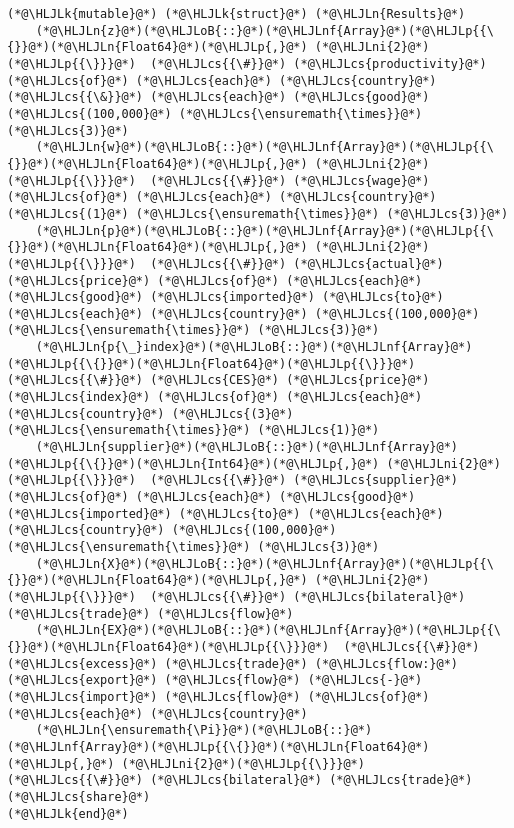 \documentclass[12pt,a4paper]{article}
\newcommand{\HLJLk}[1]{\textcolor[RGB]{148,91,176}{\textbf{#1}}}
\newcommand{\HLJLn}[1]{#1}
\newcommand{\HLJLnf}[1]{\textcolor[RGB]{66,102,213}{#1}}
\newcommand{\HLJLni}[1]{\textcolor[RGB]{59,151,46}{#1}}
\newcommand{\HLJLoB}[1]{\textcolor[RGB]{102,102,102}{\textbf{#1}}}
\newcommand{\HLJLp}[1]{#1}
\newcommand{\HLJLcs}[1]{\textcolor[RGB]{153,153,119}{\textit{#1}}}
\begin{document}
\begin{lstlisting}
(*@\HLJLk{mutable}@*) (*@\HLJLk{struct}@*) (*@\HLJLn{Results}@*)
    (*@\HLJLn{z}@*)(*@\HLJLoB{::}@*)(*@\HLJLnf{Array}@*)(*@\HLJLp{{\{}}@*)(*@\HLJLn{Float64}@*)(*@\HLJLp{,}@*) (*@\HLJLni{2}@*)(*@\HLJLp{{\}}}@*)  (*@\HLJLcs{{\#}}@*) (*@\HLJLcs{productivity}@*) (*@\HLJLcs{of}@*) (*@\HLJLcs{each}@*) (*@\HLJLcs{country}@*) (*@\HLJLcs{{\&}}@*) (*@\HLJLcs{each}@*) (*@\HLJLcs{good}@*) (*@\HLJLcs{(100,000}@*) (*@\HLJLcs{\ensuremath{\times}}@*) (*@\HLJLcs{3)}@*)
    (*@\HLJLn{w}@*)(*@\HLJLoB{::}@*)(*@\HLJLnf{Array}@*)(*@\HLJLp{{\{}}@*)(*@\HLJLn{Float64}@*)(*@\HLJLp{,}@*) (*@\HLJLni{2}@*)(*@\HLJLp{{\}}}@*)  (*@\HLJLcs{{\#}}@*) (*@\HLJLcs{wage}@*) (*@\HLJLcs{of}@*) (*@\HLJLcs{each}@*) (*@\HLJLcs{country}@*) (*@\HLJLcs{(1}@*) (*@\HLJLcs{\ensuremath{\times}}@*) (*@\HLJLcs{3)}@*)
    (*@\HLJLn{p}@*)(*@\HLJLoB{::}@*)(*@\HLJLnf{Array}@*)(*@\HLJLp{{\{}}@*)(*@\HLJLn{Float64}@*)(*@\HLJLp{,}@*) (*@\HLJLni{2}@*)(*@\HLJLp{{\}}}@*)  (*@\HLJLcs{{\#}}@*) (*@\HLJLcs{actual}@*) (*@\HLJLcs{price}@*) (*@\HLJLcs{of}@*) (*@\HLJLcs{each}@*) (*@\HLJLcs{good}@*) (*@\HLJLcs{imported}@*) (*@\HLJLcs{to}@*) (*@\HLJLcs{each}@*) (*@\HLJLcs{country}@*) (*@\HLJLcs{(100,000}@*) (*@\HLJLcs{\ensuremath{\times}}@*) (*@\HLJLcs{3)}@*)
    (*@\HLJLn{p{\_}index}@*)(*@\HLJLoB{::}@*)(*@\HLJLnf{Array}@*)(*@\HLJLp{{\{}}@*)(*@\HLJLn{Float64}@*)(*@\HLJLp{{\}}}@*)  (*@\HLJLcs{{\#}}@*) (*@\HLJLcs{CES}@*) (*@\HLJLcs{price}@*) (*@\HLJLcs{index}@*) (*@\HLJLcs{of}@*) (*@\HLJLcs{each}@*) (*@\HLJLcs{country}@*) (*@\HLJLcs{(3}@*) (*@\HLJLcs{\ensuremath{\times}}@*) (*@\HLJLcs{1)}@*)
    (*@\HLJLn{supplier}@*)(*@\HLJLoB{::}@*)(*@\HLJLnf{Array}@*)(*@\HLJLp{{\{}}@*)(*@\HLJLn{Int64}@*)(*@\HLJLp{,}@*) (*@\HLJLni{2}@*)(*@\HLJLp{{\}}}@*)  (*@\HLJLcs{{\#}}@*) (*@\HLJLcs{supplier}@*) (*@\HLJLcs{of}@*) (*@\HLJLcs{each}@*) (*@\HLJLcs{good}@*) (*@\HLJLcs{imported}@*) (*@\HLJLcs{to}@*) (*@\HLJLcs{each}@*) (*@\HLJLcs{country}@*) (*@\HLJLcs{(100,000}@*) (*@\HLJLcs{\ensuremath{\times}}@*) (*@\HLJLcs{3)}@*)
    (*@\HLJLn{X}@*)(*@\HLJLoB{::}@*)(*@\HLJLnf{Array}@*)(*@\HLJLp{{\{}}@*)(*@\HLJLn{Float64}@*)(*@\HLJLp{,}@*) (*@\HLJLni{2}@*)(*@\HLJLp{{\}}}@*)  (*@\HLJLcs{{\#}}@*) (*@\HLJLcs{bilateral}@*) (*@\HLJLcs{trade}@*) (*@\HLJLcs{flow}@*)
    (*@\HLJLn{EX}@*)(*@\HLJLoB{::}@*)(*@\HLJLnf{Array}@*)(*@\HLJLp{{\{}}@*)(*@\HLJLn{Float64}@*)(*@\HLJLp{{\}}}@*)  (*@\HLJLcs{{\#}}@*) (*@\HLJLcs{excess}@*) (*@\HLJLcs{trade}@*) (*@\HLJLcs{flow:}@*) (*@\HLJLcs{export}@*) (*@\HLJLcs{flow}@*) (*@\HLJLcs{-}@*) (*@\HLJLcs{import}@*) (*@\HLJLcs{flow}@*) (*@\HLJLcs{of}@*) (*@\HLJLcs{each}@*) (*@\HLJLcs{country}@*)
    (*@\HLJLn{\ensuremath{\Pi}}@*)(*@\HLJLoB{::}@*)(*@\HLJLnf{Array}@*)(*@\HLJLp{{\{}}@*)(*@\HLJLn{Float64}@*)(*@\HLJLp{,}@*) (*@\HLJLni{2}@*)(*@\HLJLp{{\}}}@*)  (*@\HLJLcs{{\#}}@*) (*@\HLJLcs{bilateral}@*) (*@\HLJLcs{trade}@*) (*@\HLJLcs{share}@*)
(*@\HLJLk{end}@*)


\end{lstlisting}
\end{document}
